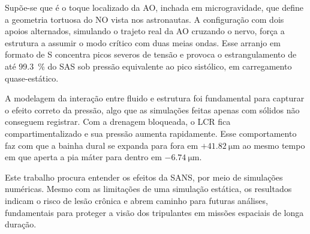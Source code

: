 \documentclass[article, hidelinks,oneside,12pt]{abntex2}
\begin{document}
Supõe-se que é o toque localizado da AO, inchada em microgravidade, que define a geometria tortuosa do NO vista nos astronautas. A configuração com dois apoios alternados, simulando o trajeto real da AO cruzando o nervo, força a estrutura a assumir o modo crítico com duas meias ondas. Esse arranjo em formato de S concentra picos severos de tensão e provoca o estrangulamento de até \SI{99.3}{\percent} do SAS sob pressão equivalente ao pico sistólico, em carregamento quase-estático.

A modelagem da interação entre fluido e estrutura foi fundamental para capturar o efeito correto da pressão, algo que as simulações feitas apenas com sólidos não conseguem registrar. Com a drenagem bloqueada, o LCR fica compartimentalizado e sua pressão aumenta rapidamente. Esse comportamento faz com que a bainha dural se expanda para fora em $+\SI{41.82}{\micro\meter}$ ao mesmo tempo em que aperta a pia máter para dentro em $-\SI{6.74}{\micro\meter}$.

Este trabalho procura entender os efeitos da SANS, por meio de simulações numéricas. Mesmo com as limitações de uma simulação estática, os resultados indicam o risco de lesão crônica e abrem caminho para futuras análises, fundamentais para proteger a visão dos tripulantes em missões espaciais de longa duração.

\newpage


\end{document}
